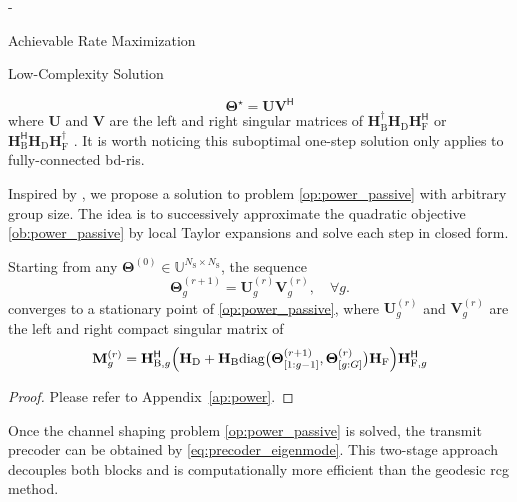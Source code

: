 \begin{section}{-}
\begin{subsection}{Achievable Rate Maximization}
\begin{subsubsection}{Low-Complexity Solution}
\begin{remark}
\begin{equation}
					\mathbf{\Theta}^\star = \mathbf{U} \mathbf{V}^\mathsf{H}
					\label{eq:orthogonal_procrustes_solution}
				\end{equation}
				where $\mathbf{U}$ and $\mathbf{V}$ are the left and right singular matrices of $\mathbf{H}_\mathrm{B}^\dagger \mathbf{H}_\mathrm{D} \mathbf{H}_\mathrm{F}^\mathsf{H}$ or $\mathbf{H}_\mathrm{B}^\mathsf{H} \mathbf{H}_\mathrm{D} \mathbf{H}_\mathrm{F}^\dagger$ \cite{Golub2013}.
				It is worth noticing this suboptimal one-step solution only applies to fully-connected \gls{bd}-\gls{ris}.
			\end{remark}

			Inspired by \cite{Nie2017}, we propose a solution to problem \eqref{op:power_passive} with arbitrary group size.
			The idea is to successively approximate the quadratic objective \eqref{ob:power_passive} by local Taylor expansions and solve each step in closed form.

			\begin{proposition}\label{pp:power}
				Starting from any $\mathbf{\Theta}^{(0)} \in \mathbb{U}^{N_\mathrm{S} \times N_\mathrm{S}}$, the sequence
				\begin{equation}
					\mathbf{\Theta}_g^{(r+1)} = \mathbf{U}_g^{(r)} \mathbf{V}_g^{(r)}, \quad \forall g.
					\label{eq:scattering_power}
				\end{equation}
				converges to a stationary point of \eqref{op:power_passive}, where $\mathbf{U}_g^{(r)}$ and $\mathbf{V}_g^{(r)}$ are the left and right compact singular matrix of
				\begin{equation}
					\mathbf{M}_g^{(r)} = \mathbf{H}_{\mathrm{B},g}^\mathsf{H} \Bigl(\mathbf{H}_\mathrm{D} + \mathbf{H}_\mathrm{B} \mathrm{diag}\bigl(\mathbf{\Theta}_{[1:g-1]}^{(r+1)},\mathbf{\Theta}_{[g:G]}^{(r)}\bigr) \mathbf{H}_\mathrm{F}\Bigr) \mathbf{H}_{\mathrm{F},g}^\mathsf{H}
					\label{eq:auxiliary_matrix_power}
				\end{equation}
			\end{proposition}

			\begin{proof}
				Please refer to Appendix~\ref{ap:power}.
			\end{proof}
			Once the channel shaping problem \eqref{op:power_passive} is solved, the transmit precoder can be obtained by \eqref{eq:precoder_eigenmode}.
			This two-stage approach decouples both blocks and is computationally more efficient than the geodesic \gls{rcg} method.
		\end{subsubsection}
	\end{subsection}
\end{section}

